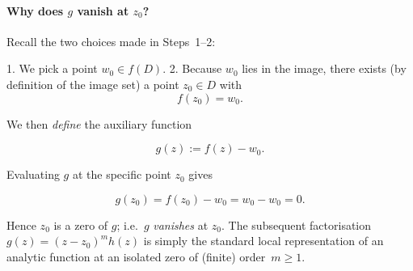 \documentclass[12pt]{article}
\theoremstyle{definition} %
\theoremstyle{plain} %
\begin{document}
\paragraph{Why does $g$ vanish at $z_0$?}

Recall the two choices made in Steps 1–2:

1.  We pick a point \(w_0\in f(D)\).  
2.  Because \(w_0\) lies in the image, there exists (by definition of
    the image set) a point \(z_0\in D\) with  
    \[
       f(z_0)=w_0 .
    \]

We then \emph{define} the auxiliary function

\[
   g(z):=f(z)-w_0 .
\]

Evaluating \(g\) at the specific point \(z_0\) gives

\[
   g(z_0)=f(z_0)-w_0 = w_0-w_0 = 0 .
\]

Hence \(z_0\) is a zero of \(g\); i.e.\ \(g\) \emph{vanishes} at \(z_0\).
The subsequent factorisation
\(
   g(z)=(z-z_0)^{m}h(z)
\)
is simply the standard local representation of an analytic function at an
isolated zero of (finite) order \(m\ge1\).
\end{document}
